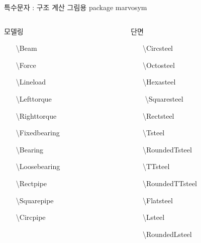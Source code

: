 \documentclass[ aspectratio=149,  10pt,blue,xcolor=pdftex,dvipsnames,table,handout,notes]{beamer}
\begin{document}
		\begin{frame}[t,shrink=0]{특수문자 : 구조 계산 그림용 package marvosym}

			\begin{columns}[t]
			\begin{column}{.4\textwidth}
			\begin{block} { 모델링 }
			\begin{enumerate}
			\item[\Beam			]	\textbackslash Beam	
			\item[\Force			]	\textbackslash Force	
			\item[\Lineload		]	\textbackslash Lineload	
			\item[\Lefttorque		]	\textbackslash Lefttorque	
			\item[\Righttorque		]	\textbackslash Righttorque	
			\item[\Fixedbearing	]	\textbackslash Fixedbearing	
			\item[\Bearing		]	\textbackslash Bearing
			\item[\Loosebearing	]	\textbackslash Loosebearing	

			\item[\Rectpipe		]	\textbackslash Rectpipe
			\item[\Squarepipe		]	\textbackslash Squarepipe	
			\item[\Circpipe		]	\textbackslash Circpipe	
			\end{enumerate}
			\end{block}
			\end{column}

			\begin{column}{.4\textwidth}
			\begin{block} { 단면 }
			\begin{enumerate}
			\item[\Circsteel		]	\textbackslash Circsteel	
			\item[\Octosteel		]	\textbackslash Octosteel	
			\item[\Hexasteel		]	\textbackslash Hexasteel
			\item[\Squaresteel		]	\textbackslash Squaresteel	
			\item[\Rectsteel		]	\textbackslash Rectsteel	

			\item[\Tsteel			]	\textbackslash Tsteel	
			\item[\RoundedTsteel	]	\textbackslash RoundedTsteel	
			\item[\TTsteel		]	\textbackslash TTsteel	
			\item[\RoundedTTsteel	]	\textbackslash RoundedTTsteel
			\item[\Flatsteel		]	\textbackslash Flatsteel	
			\item[\Lsteel			]	\textbackslash Lsteel	
			\item[\RoundedLsteel	]	\textbackslash RoundedLsteel	
			\end{enumerate}
			\end{block}
			\end{column}
			\end{columns}

		\note[item]{}
		\end{frame}
\end{document}
